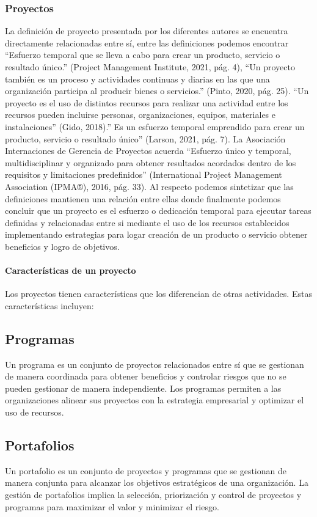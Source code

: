 \subsubsection{Proyectos}
La definición de proyecto presentada por los diferentes autores se encuentra directamente relacionadas entre sí, entre las definiciones podemos encontrar “Esfuerzo temporal que se lleva a cabo para crear un producto, servicio o resultado único.” (Project Management Institute, 2021, pág. 4), “Un proyecto también es un proceso y actividades continuas y diarias en las que una organización participa al producir bienes o servicios.” (Pinto, 2020, pág. 25). “Un proyecto es el uso de distintos recursos para realizar una actividad entre los recursos pueden incluirse personas, organizaciones, equipos, materiales e instalaciones” (Gido, 2018).” Es un esfuerzo temporal emprendido para crear un producto, servicio o resultado único” (Larson, 2021, pág. 7). La Asociación Internaciones de Gerencia de Proyectos acuerda “Esfuerzo único y temporal, multidisciplinar y organizado para obtener resultados acordados dentro de los requisitos y limitaciones predefinidos” (International Project Management Association (IPMA®), 2016, pág. 33). Al respecto podemos sintetizar que las definiciones mantienen una relación entre ellas donde finalmente podemos concluir que un proyecto es el esfuerzo o dedicación temporal para ejecutar tareas definidas y relacionadas entre si mediante el uso de los recursos establecidos implementando estrategias para logar creación de un producto o servicio obtener beneficios y logro de objetivos.

\paragraph{Características de un proyecto}
Los proyectos tienen características que los diferencian de otras actividades. Estas características incluyen:

\subsection{Programas}
Un programa es un conjunto de proyectos relacionados entre sí que se gestionan de manera coordinada para obtener beneficios y controlar riesgos que no se pueden gestionar de manera independiente. Los programas permiten a las organizaciones alinear sus proyectos con la estrategia empresarial y optimizar el uso de recursos.

\subsection{Portafolios}
Un portafolio es un conjunto de proyectos y programas que se gestionan de manera conjunta para alcanzar los objetivos estratégicos de una organización. La gestión de portafolios implica la selección, priorización y control de proyectos y programas para maximizar el valor y minimizar el riesgo.

